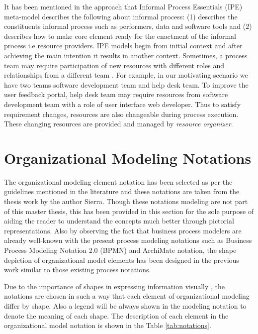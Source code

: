 It has been mentioned in the approach \cite{Sungur2014} that Informal Process Essentials (IPE) meta-model describes the following about informal process: (1) describes the constituents informal process such as performers, data and software tools and (2) describes how to make core element ready for the enactment of the informal process i.e resource providers. IPE models begin from initial context and after achieving the main intention it results in another context. Sometimes, a process team may require participation of  new resources with different roles and relationships from a different team \cite{Matthews2011,Matthews2012}. For example, in our motivating scenario we have two teams  software development team and help desk team. To improve the user feedback portal, help desk team may require resources from software development team with a role of user interface web developer. Thus to satisfy requirement changes, resources are also changeable during process execution. These changing resources are provided and managed by \textit{resource organizer}. 

\section{Organizational Modeling Notations}
\label{sec:resourcecentricorganizationalmodeling}
The organizational modeling element notation has been selected as per the guidelines mentioned in the literature \cite{Moody2009} and these notations are taken from the thesis work by the author Sierra\cite{Sierr2015}. Though these notations modeling are not part of this master thesis, this has been provided in this section for the sole purpose of aiding the reader to understand the concepts much better through pictorial representations. Also by observing  the fact that business process modelers are already well-known with the present process modeling notations such as Business Process Modeling Notation 2.0 (BPMN) \cite{bpm2011} and ArchiMate notation\cite{arc2013}, the shape depiction of organizational model elements has been designed in the previous work \cite{Sierr2015} similar to those existing process notations. 

Due to the importance of shapes in expressing information visually \cite{Moody2009}, the notations are chosen in such a way that each element of organizational modeling  differ by shape. Also a legend will be always shown in the modeling notation to denote the meaning of each shape. The description of each element in the organizational model notation is shown in the Table \ref{tab:notations}. 

